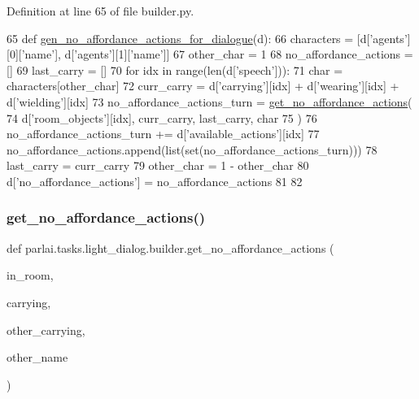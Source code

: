 Definition at line 65 of file builder.\+py.


\begin{DoxyCode}
65 \textcolor{keyword}{def }\hyperlink{namespaceparlai_1_1tasks_1_1light__dialog_1_1builder_a537e075c89058b67eb0db786f98491de}{gen\_no\_affordance\_actions\_for\_dialogue}(d):
66     characters = [d[\textcolor{stringliteral}{'agents'}][0][\textcolor{stringliteral}{'name'}], d[\textcolor{stringliteral}{'agents'}][1][\textcolor{stringliteral}{'name'}]]
67     other\_char = 1
68     no\_affordance\_actions = []
69     last\_carry = []
70     \textcolor{keywordflow}{for} idx \textcolor{keywordflow}{in} range(len(d[\textcolor{stringliteral}{'speech'}])):
71         char = characters[other\_char]
72         curr\_carry = d[\textcolor{stringliteral}{'carrying'}][idx] + d[\textcolor{stringliteral}{'wearing'}][idx] + d[\textcolor{stringliteral}{'wielding'}][idx]
73         no\_affordance\_actions\_turn = \hyperlink{namespaceparlai_1_1tasks_1_1light__dialog_1_1builder_a51921236462b49d240bfde4a648c3ec3}{get\_no\_affordance\_actions}(
74             d[\textcolor{stringliteral}{'room\_objects'}][idx], curr\_carry, last\_carry, char
75         )
76         no\_affordance\_actions\_turn += d[\textcolor{stringliteral}{'available\_actions'}][idx]
77         no\_affordance\_actions.append(list(set(no\_affordance\_actions\_turn)))
78         last\_carry = curr\_carry
79         other\_char = 1 - other\_char
80     d[\textcolor{stringliteral}{'no\_affordance\_actions'}] = no\_affordance\_actions
81 
82 
\end{DoxyCode}
\mbox{\label{namespaceparlai_1_1tasks_1_1light__dialog_1_1builder_a51921236462b49d240bfde4a648c3ec3}} 
\subsubsection{\texorpdfstring{get\+\_\+no\+\_\+affordance\+\_\+actions()}{get\_no\_affordance\_actions()}}
{\footnotesize\ttfamily def parlai.\+tasks.\+light\+\_\+dialog.\+builder.\+get\+\_\+no\+\_\+affordance\+\_\+actions (\begin{DoxyParamCaption}\item[{}]{in\+\_\+room,  }\item[{}]{carrying,  }\item[{}]{other\+\_\+carrying,  }\item[{}]{other\+\_\+name }\end{DoxyParamCaption})}




